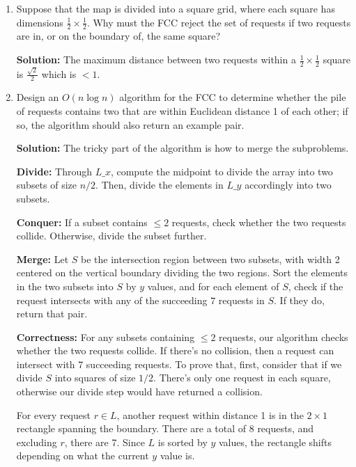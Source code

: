 \documentclass[12pt]{article}
\begin{document}
\begin{enumerate}
	\item Suppose that the map is divided into a square grid, where each square has dimensions $\frac{1}{2} \times \frac{1}{2}$. Why must the FCC reject the set of requests if two requests are in, or on the boundary of, the same square? \\
	\par{\textbf{Solution:} The maximum distance between two requests within a $\frac{1}{2} \times \frac{1}{2}$ square is $\frac{\sqrt{2}}{2}$ which is $< 1$.}
	\item Design an $O(n\log{n})$ algorithm for the FCC to determine whether the pile of requests contains two that are within Euclidean distance 1 of each other; if so, the algorithm should also return an example pair. \\
	\par{\textbf{Solution:} The tricky part of the algorithm is how to merge the subproblems.}
	\par{\textbf{Divide:} Through $L\_x$, compute the midpoint to divide the array into two subsets of size $n/2$. Then, divide the elements in $L\_y$ accordingly into two subsets.}
	\par{\textbf{Conquer:} If a subset contains $\leq 2$ requests, check whether the two requests collide. Otherwise, divide the subset further.}
	\par{\textbf{Merge:} Let $S$ be the intersection region between two subsets, with width 2 centered on the vertical boundary dividing the two regions. Sort the elements in the two subsets into $S$ by $y$ values, and for each element of $S$, check if the request intersects with any of the succeeding $7$ requests in $S$. If they do, return that pair.}
	\par{\textbf{Correctness:} For any subsets containing $\leq 2$ requests, our algorithm checks whether the two requests collide. If there's no collision, then a request can intersect with 7 succeeding requests. To prove that, first, consider that if we divide $S$ into squares of size $1/2$. There's only one request in each square, otherwise our divide step would have returned a collision.}
	\par{For every request $r \in L$, another request within distance 1 is in the $2 \times 1$ rectangle spanning the boundary. There are a total of 8 requests, and excluding $r$, there are 7. Since $L$ is sorted by $y$ values, the rectangle shifts depending on what the current $y$ value is.}
\end{enumerate}
\end{document}
